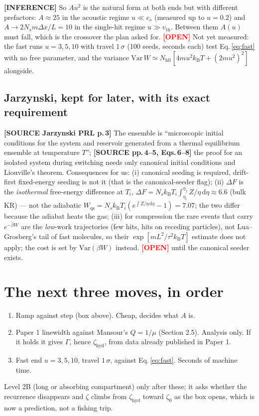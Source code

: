 \documentclass[11pt,a4paper]{article}
\newcommand{\kT}{k_{\mathrm B}T}
\newcommand{\dd}{\mathrm{d}}
\newcommand{\src}[1]{\textcolor{OliveGreen}{\textbf{[SOURCE #1]}}}
\newcommand{\infr}{\textcolor{BurntOrange}{\textbf{[INFERENCE]}}}
\newcommand{\opn}{\textcolor{Red}{\textbf{[OPEN]}}}
\begin{document}
\infr{} So $A u^2$ is the natural form at both ends but with different prefactors: $A \approx 25$ in the acoustic regime $u \ll c_s$ (measured up to $u = 0.2$) and $A \to 2N_s m\Delta x/L = 10$ in the single-hit regime $u \gg v_{\mathrm{th}}$. Between them $A(u)$ must fall, which is the crossover the plan asked for. \opn{} Not yet measured: the fast runs $u = 3, 5, 10$ with travel $1\,\sigma$ (100 seeds, seconds each) test Eq.\,\eqref{eq:fast} with no free parameter, and the variance $\mathrm{Var}\,W \simeq N_{\mathrm{hit}}[4mu^2\kT + (2mu^2)^2]$ alongside.

\subsection{Jarzynski, kept for later, with its exact requirement}
\src{Jarzynski PRL p.\,3} The ensemble is ``microscopic initial conditions for the system and reservoir generated from a thermal equilibrium ensemble at temperature $T$''; \src{pp.\,4--5, Eqs.\,6--8} the proof for an isolated system during switching needs only canonical initial conditions and Liouville's theorem. Consequences for us: (i) canonical seeding is required, drift-first fixed-energy seeding is not it (that is the canonical-seeder flag); (ii) $\Delta F$ is the \emph{isothermal} free-energy difference at $T_i$, $\Delta F = N_s\kT_i\int_{\eta_i}^{\eta_f} Z/\eta\,\dd\eta \approx 6.6$ (bulk KR) --- not the adiabatic $W_{\mathrm{qs}} = N_s\kT_i(e^{\int Z/\eta\,\dd\eta} - 1) = 7.07$; the two differ because the adiabat heats the gas; (iii) for compression the rare events that carry $\overline{e^{-\beta W}}$ are the \emph{low}-work trajectories (few hits, hits on receding particles), not Lua--Grosberg's tail of fast molecules, so their $\exp[mL^2/\tau^2\kT]$ estimate does not apply; the cost is set by $\mathrm{Var}(\beta W)$ instead. \opn{} until the canonical seeder exists.

\section{The next three moves, in order}
\begin{enumerate}[nosep]
\item Ramp against step (box above). Cheap, decides what $A$ is.
\item Paper 1 linewidth against Mansour's $Q = 1/\mu$ (Section 2.5). Analysis only. If it holds it gives $\Gamma$, hence $\zeta_{\mathrm{hyd}}$, from data already published in Paper 1.
\item Fast end $u = 3, 5, 10$, travel $1\,\sigma$, against Eq.\,\eqref{eq:fast}. Seconds of machine time.
\end{enumerate}
Level 2B (long or absorbing compartment) only after these; it asks whether the recurrence disappears and $\zeta$ climbs from $\zeta_{\mathrm{hyd}}$ toward $\zeta_0$ as the box opens, which is now a prediction, not a fishing trip.
\end{document}
